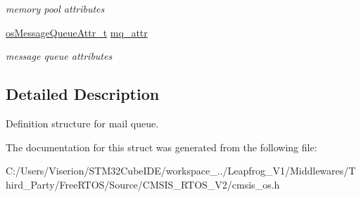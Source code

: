 \begin{DoxyCompactItemize}
\begin{DoxyCompactList}\small\item\em memory pool attributes \end{DoxyCompactList}\item 
\mbox{\label{structos__mail_q__def_a9b7292e12ae0b3ace5c9308f447c7663}} 
\mbox{\hyperlink{structos_message_queue_attr__t}{os\+Message\+Queue\+Attr\+\_\+t}} \mbox{\hyperlink{structos__mail_q__def_a9b7292e12ae0b3ace5c9308f447c7663}{mq\+\_\+attr}}
\begin{DoxyCompactList}\small\item\em message queue attributes \end{DoxyCompactList}\end{DoxyCompactItemize}


\subsection{Detailed Description}
Definition structure for mail queue. 

The documentation for this struct was generated from the following file\+:\begin{DoxyCompactItemize}
\item 
C\+:/\+Users/\+Viserion/\+S\+T\+M32\+Cube\+I\+D\+E/workspace\+\_../\+Leapfrog\+\_\+\+V1/\+Middlewares/\+Third\+\_\+\+Party/\+Free\+R\+T\+O\+S/\+Source/\+C\+M\+S\+I\+S\+\_\+\+R\+T\+O\+S\+\_\+\+V2/cmsis\+\_\+os.\+h\end{DoxyCompactItemize}
